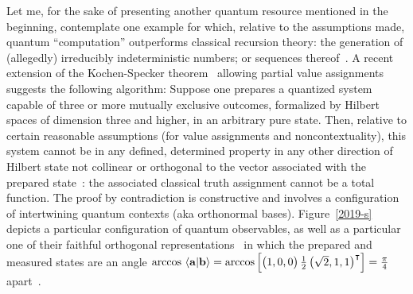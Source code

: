 \documentclass[runningheads]{llncs}
\begin{document}
Let me, for the sake of presenting another quantum resource mentioned in the beginning, contemplate one example for which, relative to the assumptions made,
quantum ``computation'' outperforms
classical recursion theory: the generation of (allegedly) irreducibly indeterministic numbers; or sequences thereof~\cite{2014-nobit}.
A recent extension of the
Kochen-Specker theorem~\cite{2012-incomput-proofsCJ,PhysRevA.89.032109,2015-AnalyticKS}
allowing partial value assignments suggests the following algorithm:
Suppose one prepares a quantized system capable of three or more mutually exclusive outcomes,
formalized by Hilbert spaces of dimension three and higher, in an arbitrary pure state.
Then,
relative to certain reasonable assumptions (for value assignments and noncontextuality),
this system cannot be in any defined, determined property in any other direction of Hilbert state not
collinear or orthogonal to the vector associated with the prepared state~\cite{pitowsky:218,hru-pit-2003}:
the associated classical truth assignment cannot be a total function.
The proof by contradiction is constructive and involves a configuration of intertwining quantum contexts (aka orthonormal bases).
Figure~\ref{2019-s} depicts a particular configuration of quantum observables, as well as a particular one of their faithful orthogonal representations~\cite{lovasz-79}
in which the prepared and measured states are an angle
$
\text{arccos } \langle {\bf a}\vert {\bf b} \rangle =
\text{arccos} \left[
\begin{pmatrix}
1,0,0
\end{pmatrix}   \frac{1}{2}
\begin{pmatrix}
\sqrt{2},1,1
\end{pmatrix}^\intercal
\right] = \frac{\pi}{4}$ apart~\cite[Table~1]{2015-AnalyticKS}.
\newif\iflabel \labeltrue
\end{document}
